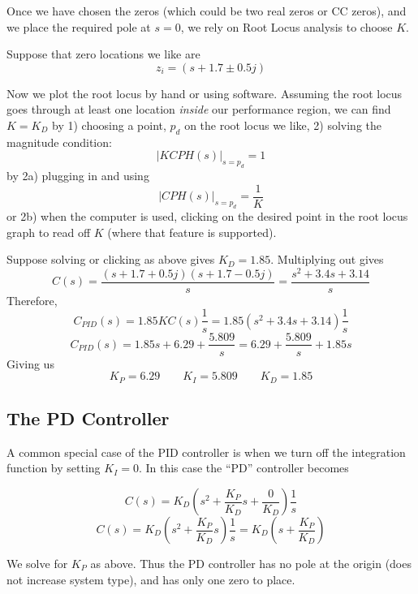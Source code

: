 Once we have chosen the zeros (which could be two real zeros or CC zeros), and we place the
required pole at $s=0$, we rely on Root Locus analysis to choose $K$.


Suppose that zero locations we like are
\[
z_i = (s + 1.7 \pm 0.5j)
\]

Now we plot the root locus by hand or using software.  Assuming the root locus goes through at least
one location {\it inside} our performance region, we can find $K=K_D$ by
1) choosing a point, $p_d$ on the root locus we like,
2) solving the magnitude condition:
\[
\left | KCPH(s) \right|_{s=p_d} =1
\]
by
2a) plugging in and using
\[
\left | CPH(s) \right|_{s=p_d} =\frac {1}  {K}
\]
or 2b)
when the computer is used, clicking on the desired point in the root locus graph to read off $K$
(where that feature is supported).


Suppose solving or clicking as above gives $K_D = 1.85$.
Multiplying out gives
\[
C(s) = \frac{(s + 1.7 + 0.5j)(s + 1.7 - 0.5j)}{s}  = \frac{s^2 + 3.4s + 3.14}{s}
\]
Therefore,
\[
C_{PID}(s) = 1.85 KC(s) \frac{1}{s} = 1.85(s^2 + 3.4s + 3.14)\frac{1}{s}
\]
\[
C_{PID}(s) = 1.85s + 6.29 + \frac {5.809} {s} = 6.29 + \frac {5.809} {s} + 1.85s
\]
Giving us
\[
K_P  = 6.29   \qquad  K_I =  5.809 \qquad K_D = 1.85
\]


\subsection{The PD Controller}
A common special case of the PID controller is when we turn off the
integration function by setting $K_I=0$.
In this case the ``PD''  controller becomes

\[
C(s) = K_D \left ( s^2+ \frac{K_P}{K_D}s + \frac{0}{K_D} \right ) \frac{1}{s}
\]
 \[
 C(s) = K_D \left ( s^2+ \frac{K_P}{K_D}s \right ) \frac{1}{s} = K_D\left ( s+\frac {K_P}  {K_D} \right )
 \]

We solve for $K_P$ as above.
Thus the PD controller has no pole at the origin (does not increase
 system type), and has only one zero to place.


